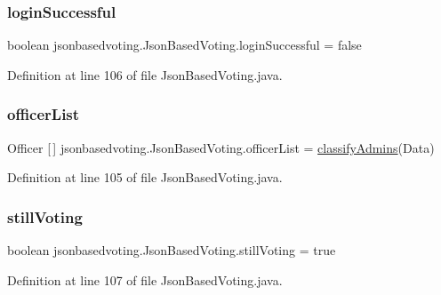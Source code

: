 \subsubsection{\texorpdfstring{loginSuccessful}{loginSuccessful}}
{\footnotesize\ttfamily boolean jsonbasedvoting.\+Json\+Based\+Voting.\+login\+Successful = false\hspace{0.3cm}{\ttfamily [static]}}



Definition at line 106 of file Json\+Based\+Voting.\+java.

\mbox{\label{classjsonbasedvoting_1_1_json_based_voting_a727f0bdc690e796c13428b4448be9456}} 
\subsubsection{\texorpdfstring{officerList}{officerList}}
{\footnotesize\ttfamily Officer \mbox{[}$\,$\mbox{]} jsonbasedvoting.\+Json\+Based\+Voting.\+officer\+List = \mbox{\hyperlink{classjsonbasedvoting_1_1_json_based_voting_a8ae3b015105859acfa80cfcf3e481174}{classify\+Admins}}(Data)\hspace{0.3cm}{\ttfamily [static]}}



Definition at line 105 of file Json\+Based\+Voting.\+java.

\mbox{\label{classjsonbasedvoting_1_1_json_based_voting_a560cc9720f1a7101b2e1cbdf2bbe7b76}} 
\subsubsection{\texorpdfstring{stillVoting}{stillVoting}}
{\footnotesize\ttfamily boolean jsonbasedvoting.\+Json\+Based\+Voting.\+still\+Voting = true\hspace{0.3cm}{\ttfamily [static]}}



Definition at line 107 of file Json\+Based\+Voting.\+java.

